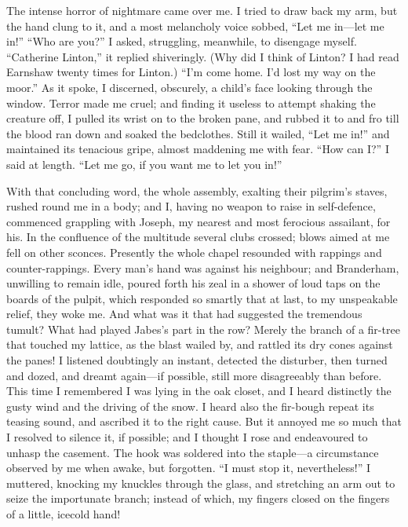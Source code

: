 The intense horror of nightmare came over me.  I tried to draw
back my arm, but the hand clung to it, and a most melancholy voice
sobbed, ``Let me in---let me in!'' ``Who are you?'' I asked, struggling,
meanwhile, to disengage myself. ``Catherine Linton,'' it replied
shiveringly. (Why did I think of Linton? I had read Earnshaw twenty
times for Linton.) ``I'm come home. I'd lost my way on the moor.''  As
it spoke, I discerned, obscurely, a child's face looking through the
window. Terror made me cruel; and finding it useless to attempt shaking
the creature off, I pulled its wrist on to the broken pane, and rubbed
it to and fro till the blood ran down and soaked the bedclothes. Still
it wailed, ``Let me in!'' and maintained its tenacious gripe, almost
maddening me with fear. ``How can I?''  I said at length. ``Let me go,
if you want me to let you in!''

With that concluding word, the whole assembly,
exalting their pilgrim's staves, rushed round me in a body; and I,
having no weapon to raise in self-defence, commenced grappling with
Joseph, my nearest and most ferocious assailant, for his. In the
confluence of the multitude several clubs crossed; blows aimed at me
fell on other sconces. Presently the whole chapel resounded with
rappings and counter-rappings. Every man's hand was against his
neighbour; and Branderham, unwilling to remain idle, pour\-ed forth his
zeal in a shower of loud taps on the boards of the pulpit, which
responded so smartly that at last, to my unspeakable relief, they woke
me. And what was it that had suggested the tremendous tumult? What had
played Jabes's part in the row?  Merely the branch of a fir-tree that
touched my lattice, as the blast wailed by, and rattled its dry cones
against the panes! I listened doubtingly an instant, detected the
disturber, then turned and dozed, and dreamt again---if possible, still
more disagreeably than before.  This time I remembered I was lying in
the oak closet, and I heard distinctly the gusty wind and the driving of
the snow. I heard also the fir-bough repeat its teasing sound, and
ascribed it to the right cause.  But it annoyed me so much that I
resolved to silence it, if possible; and I thought I rose and
endeavoured to unhasp the casement. The hook was soldered into the
staple---a circumstance observed by me when awake, but forgotten. ``I
must stop it, nevertheless!'' I muttered, knocking my knuckles through
the glass, and stretching an arm out to seize the importunate branch;
instead of which, my fingers closed on the fingers of a little, icecold
hand!

